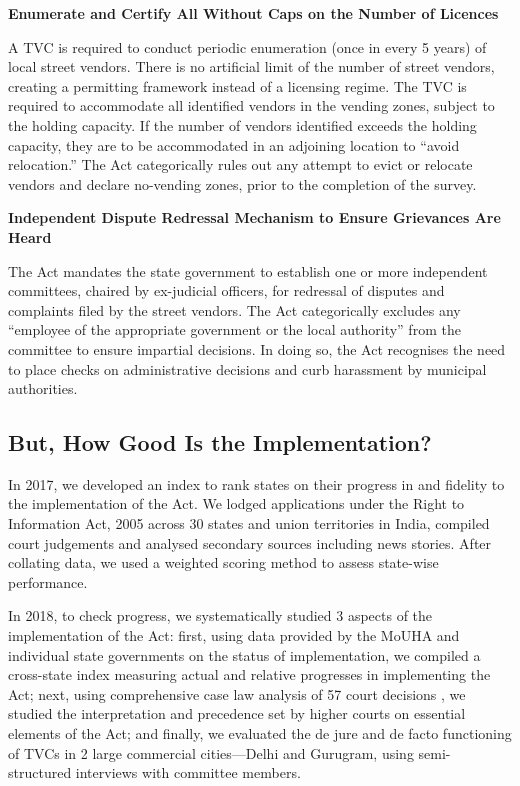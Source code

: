 \documentclass[a4paper, 12pt, twoside]{article}
\begin{document}
{\textbf{Enumerate and Certify All Without Caps on the Number of Licences}

A TVC is required to conduct periodic enumeration (once in every 5 years) of local street vendors. There is no artificial limit of the number of street vendors, creating a permitting framework instead of a licensing regime. The TVC is required to accommodate all identified vendors in the vending zones, subject to the holding capacity.  If the number of vendors identified exceeds the holding capacity, they are to be accommodated in an adjoining location to “avoid relocation.” The Act categorically rules out any attempt to evict or relocate vendors and declare no-vending zones, prior to the completion of the survey.

\newpage
\textbf{Independent Dispute Redressal Mechanism to Ensure Grievances Are Heard }

The Act mandates the state government to establish one or more independent committees, chaired by ex-judicial officers, for redressal of disputes and complaints filed by the street vendors. The Act categorically excludes any “employee of the appropriate government or the local authority” from the committee to ensure impartial decisions. In doing so, the Act recognises the need to place checks on administrative decisions and curb harassment by municipal authorities.

\subsection*{But, How Good Is the Implementation?}

In 2017, we developed an index to rank states on their progress in and fidelity to the implementation of the Act. We lodged applications under the Right to Information Act, 2005 across 30 states and union territories in India, compiled court judgements and analysed secondary sources including news stories. After collating data, we used a weighted scoring method to assess state-wise performance.

In 2018, to check progress, we systematically studied 3 aspects of the implementation of the Act: first, using data provided by the MoUHA and individual state governments on the status of implementation, we compiled a cross-state index measuring actual and relative progresses in implementing the Act; next, using comprehensive case law analysis of 57 court decisions , we studied the interpretation and precedence set by higher courts on essential elements of the Act; and finally, we evaluated the de jure and de facto functioning of TVCs in 2 large commercial cities—Delhi and Gurugram, using semi-structured interviews with committee members.

}
\end{document}
